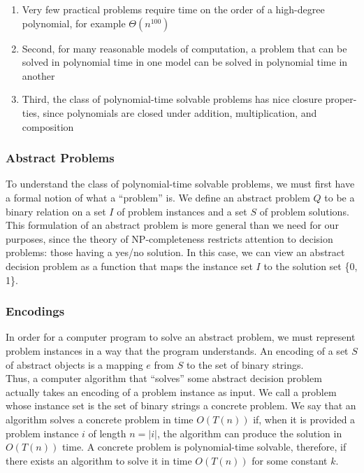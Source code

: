\begin{enumerate}
	\item Very few practical problems require time on the order of a high-degree polynomial, for example $\Theta(n^{100})$
	\item Second, for many reasonable models of computation, a problem that can be solved in polynomial time in one model can be solved in polynomial time in another 
	\item Third, the class of polynomial-time solvable problems has nice closure proper- ties, since polynomials are closed under addition, multiplication, and composition
\end{enumerate}

\subsubsection{Abstract Problems}
To understand the class of polynomial-time solvable problems, we must first have a formal notion of what a ``problem'' is. We define an abstract problem $Q$ to be a binary relation on a set $I$ of problem instances and a set $S$ of problem solutions. This formulation of an abstract problem is more general than we need for our purposes, since the theory of NP-completeness restricts attention to decision problems: those having a yes/no solution. In this case, we can view an abstract decision problem as a function that maps the instance set $I$ to the solution set \{0, 1\}.

\subsubsection{Encodings}
In order for a computer program to solve an abstract problem, we must represent problem instances in a way that the program understands. An encoding of a set $S$ of abstract objects is a mapping $e$ from $S$ to the set of binary strings.\\

Thus, a computer algorithm that ``solves'' some abstract decision problem actually takes an encoding of a problem instance as input. We call a problem whose instance set is the set of binary strings a concrete problem. We say that an algorithm solves a concrete problem in time $O(T(n))$ if, when it is provided a problem instance $i$ of length $n = |i|$, the algorithm can produce the solution in $O(T(n))$ time. A concrete problem is polynomial-time solvable, therefore, if there exists an algorithm to solve it in time $O(T(n))$ for some constant $k$.\\

